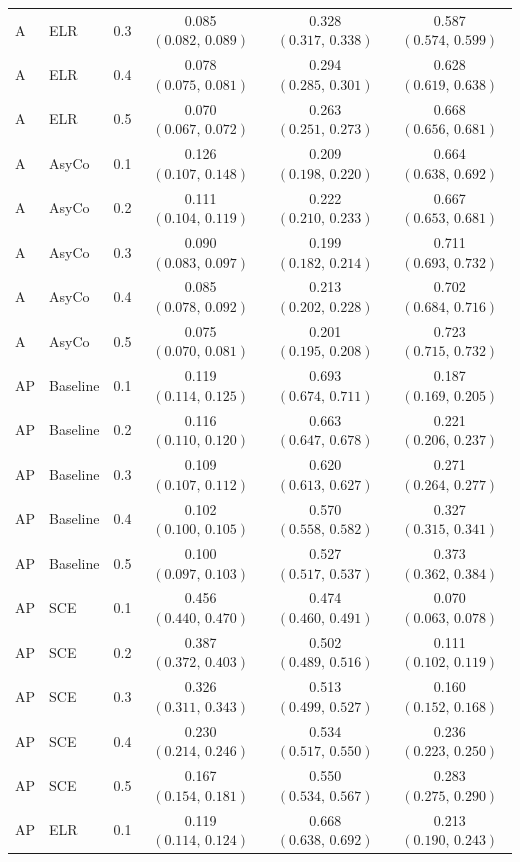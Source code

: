 \begin{small}
\begin{longtable}{lllccc}
A & ELR & 0.3 & 0.085 $(0.082,\,0.089)$ & 0.328 $(0.317,\,0.338)$ & 0.587 $(0.574,\,0.599)$ \\
A & ELR & 0.4 & 0.078 $(0.075,\,0.081)$ & 0.294 $(0.285,\,0.301)$ & 0.628 $(0.619,\,0.638)$ \\
A & ELR & 0.5 & 0.070 $(0.067,\,0.072)$ & 0.263 $(0.251,\,0.273)$ & 0.668 $(0.656,\,0.681)$ \\
A & AsyCo & 0.1 & 0.126 $(0.107,\,0.148)$ & 0.209 $(0.198,\,0.220)$ & 0.664 $(0.638,\,0.692)$ \\
A & AsyCo & 0.2 & 0.111 $(0.104,\,0.119)$ & 0.222 $(0.210,\,0.233)$ & 0.667 $(0.653,\,0.681)$ \\
A & AsyCo & 0.3 & 0.090 $(0.083,\,0.097)$ & 0.199 $(0.182,\,0.214)$ & 0.711 $(0.693,\,0.732)$ \\
A & AsyCo & 0.4 & 0.085 $(0.078,\,0.092)$ & 0.213 $(0.202,\,0.228)$ & 0.702 $(0.684,\,0.716)$ \\
A & AsyCo & 0.5 & 0.075 $(0.070,\,0.081)$ & 0.201 $(0.195,\,0.208)$ & 0.723 $(0.715,\,0.732)$ \\
AP & Baseline & 0.1 & 0.119 $(0.114,\,0.125)$ & 0.693 $(0.674,\,0.711)$ & 0.187 $(0.169,\,0.205)$ \\
AP & Baseline & 0.2 & 0.116 $(0.110,\,0.120)$ & 0.663 $(0.647,\,0.678)$ & 0.221 $(0.206,\,0.237)$ \\
AP & Baseline & 0.3 & 0.109 $(0.107,\,0.112)$ & 0.620 $(0.613,\,0.627)$ & 0.271 $(0.264,\,0.277)$ \\
AP & Baseline & 0.4 & 0.102 $(0.100,\,0.105)$ & 0.570 $(0.558,\,0.582)$ & 0.327 $(0.315,\,0.341)$ \\
AP & Baseline & 0.5 & 0.100 $(0.097,\,0.103)$ & 0.527 $(0.517,\,0.537)$ & 0.373 $(0.362,\,0.384)$ \\
AP & SCE & 0.1 & 0.456 $(0.440,\,0.470)$ & 0.474 $(0.460,\,0.491)$ & 0.070 $(0.063,\,0.078)$ \\
AP & SCE & 0.2 & 0.387 $(0.372,\,0.403)$ & 0.502 $(0.489,\,0.516)$ & 0.111 $(0.102,\,0.119)$ \\
AP & SCE & 0.3 & 0.326 $(0.311,\,0.343)$ & 0.513 $(0.499,\,0.527)$ & 0.160 $(0.152,\,0.168)$ \\
AP & SCE & 0.4 & 0.230 $(0.214,\,0.246)$ & 0.534 $(0.517,\,0.550)$ & 0.236 $(0.223,\,0.250)$ \\
AP & SCE & 0.5 & 0.167 $(0.154,\,0.181)$ & 0.550 $(0.534,\,0.567)$ & 0.283 $(0.275,\,0.290)$ \\
AP & ELR & 0.1 & 0.119 $(0.114,\,0.124)$ & 0.668 $(0.638,\,0.692)$ & 0.213 $(0.190,\,0.243)$ \\

\end{longtable}
\end{small}
